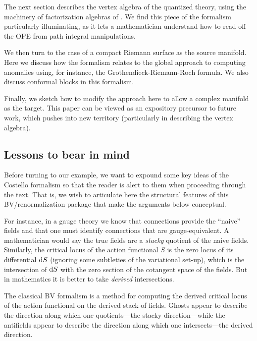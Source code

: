 The next section describes the vertex algebra of the quantized theory,
using the machinery of factorization algebras of \cite{CG1, CG2}.
We find this piece of the formalism particularly illuminating,
as it lets a mathematician understand how to read off the OPE from path integral manipulations.

We then turn to the case of a compact Riemann surface as the source manifold.
Here we discuss how the formalism relates to the global approach to computing anomalies using, for instance, the Grothendieck-Riemann-Roch formula.
We also discuss conformal blocks in this formalism.

Finally, we sketch how to modify the approach here to allow a complex manifold as the target.
This paper can be viewed as an expository precursor to future work,
which pushes into new territory (particularly in describing the vertex algebra).

\subsection{Lessons to bear in mind}

Before turning to our example,
we want to expound some key ideas of the Costello formalism so that the reader is alert to them when proceeding through the text.
That is, we wish to articulate here the structural features of this BV/renormalization package that make the arguments below conceptual.

For instance, in a gauge theory we know that connections provide the ``naive'' fields and that one must identify connections that are gauge-equivalent.
A mathematician would say the true fields are a {\em stacky} quotient of the naive fields.
Similarly, the critical locus of the action functional $S$ is the zero locus of its differential ${\rm d} S$ (ignoring some subtleties of the variational set-up),
which is the intersection of ${\rm d} S$ with the zero section of the cotangent space of the fields.
But in mathematics it is better to take {\em derived} intersections.

\begin{lesson}
The classical BV formalism is a method for computing the derived critical locus of the action functional on the derived stack of fields.
Ghosts appear to describe the direction along which one quotients---the stacky direction---while the antifields appear to describe the direction along which one intersects---the derived direction.
\end{lesson}

